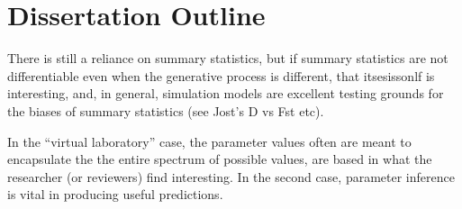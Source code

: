 \documentclass[]{article}
\begin{document}
%
%
%

\hypertarget{dissertation-outline}{%
\section{Dissertation Outline}\label{dissertation-outline}}

\clearpage


There is still a reliance on summary statistics, but if summary
statistics are not differentiable even when the generative process is
different, that itsesissonlf is interesting, and, in general, simulation
models are excellent testing grounds for the biases of summary
statistics (see Jost's D vs Fst etc).

In the ``virtual laboratory'' case, the parameter values often are meant
to encapsulate the the entire spectrum of possible values, are based in
what the researcher (or reviewers) find interesting. In the second case,
parameter inference is vital in producing useful predictions.
\end{document}
